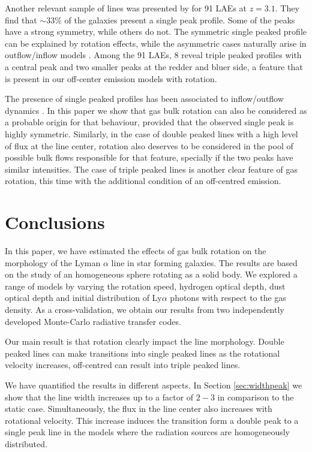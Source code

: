 \documentclass{emulateapj}
\newcommand{\ly}{{\ifmmode{{\rm Ly}\alpha~}\else{Ly$\alpha$~}\fi}}
\begin{document}
Another relevant sample of lines was presented by \cite{Yamada2012} 
for 91 LAEs at $z=3.1$. They find that $\sim 33 \%$ of the galaxies present 
a single peak profile. Some of the peaks have a strong symmetry, while
others do not. The symmetric single peaked profile can be explained by
rotation effects, while the asymmetric cases naturally arise in
outflow/inflow models \citep{Verhamme2008, Dijkstra06}. Among the 91
LAEs, 8 reveal triple peaked profiles with a central peak and two
smaller peaks at the redder and bluer side, a feature that is present
in our off-center emission models with rotation. 

The presence of single peaked profiles has been associated to
inflow/outflow dynamics \citep{XXX}. In this paper we show that gas
bulk rotation can also be considered as a probable origin for that
behaviour, provided that the observed single peak is highly
symmetric. Similarly, in the case of double peaked lines with a high
level of flux at the line center, rotation also deserves to be considered in
the pool of possible bulk flows responsible for that feature,
specially if the two peaks have similar intensities. The case of
triple peaked lines is another clear feature of gas rotation, this
time with the additional condition of an off-centred emission.


\section{Conclusions}
\label{sec:conclusions}

In this paper, we have estimated the effects of gas bulk rotation on
the morphology of the Lyman $\alpha$ line in star forming
galaxies. The results are based on the study of an homogeneous sphere
rotating as a solid body. We explored  a range of models by varying
the rotation speed, hydrogen optical depth, dust optical depth and
initial distribution of Ly$\alpha$ photons with respect to the gas
density. As a cross-validation, we obtain our results from two
independently developed Monte-Carlo radiative transfer codes.

Our main result is that rotation clearly impact the \ly line
morphology. Double peaked lines can make transitions into single
peaked lines as the rotational velocity increases, off-centred
can result into triple peaked lines. 

We have quantified the results in different aspects. In Section
\ref{sec:widthpeak} we show that the line width increases up to a
factor of $2-3$ in comparison to the static case. Simultaneously, the
flux in the line center also increases with rotational velocity. This
increase induces the transition form a double peak to a single peak
line in the models where the radiation sources are homogeneously
distributed.
\end{document}
